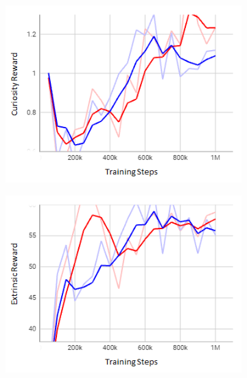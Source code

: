 \documentclass[letterpaper, 10 pt, conference]{ieeeconf}  %
\begin{document}
\begin{figure}[t]
\begin{subfigure}[b]{0.16\linewidth}
			\includegraphics[width=\linewidth]{Fig9c.png}
			\caption{}
			\label{fig9c}
		\end{subfigure}
		\hfill
		\begin{subfigure}[b]{0.16\linewidth}
			\centering
			\includegraphics[width=\linewidth]{Fig9d.png}
			\caption{}
			\label{fig9d}
		\end{subfigure}
		\hfill
		\begin{subfigure}[b]{0.16\linewidth}
			\centering

\end{subfigure}
\end{figure}
\end{document}
